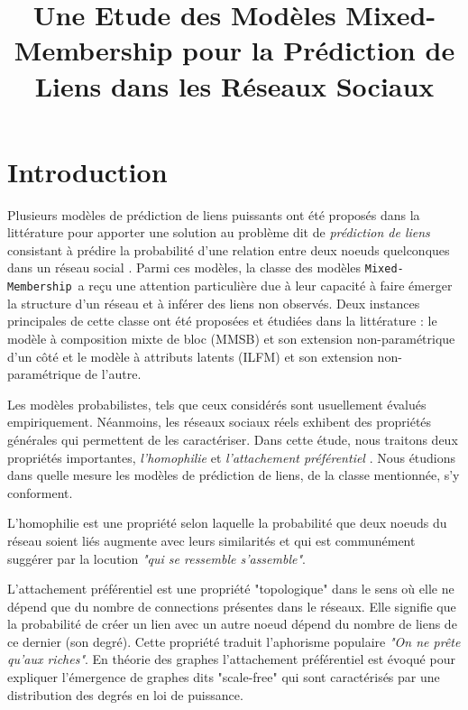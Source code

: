 \documentclass[french]{hermes-journal}
\title[]{Une Etude des Modèles Mixed-Membership pour la Prédiction de Liens dans les Réseaux Sociaux}
\newcommand{\mmm}{\texttt{Mixed-Membership}~}
\begin{document}
\maketitle

\newpage






\section{Introduction}

\label{sec:intro}

Plusieurs modèles de prédiction de liens puissants ont été proposés dans la littérature pour apporter une solution au problème dit de \textit{prédiction de liens} consistant à prédire la probabilité d'une relation entre deux noeuds quelconques dans un réseau social \cite{LibenNowell07, HassanZaki11}.
Parmi ces modèles, la classe des modèles \mmm a reçu une attention particulière due à leur capacité à faire émerger la structure d'un réseau et à inférer des liens non observés.
Deux instances principales de cette classe ont été proposées et étudiées  dans la littérature : le modèle à composition mixte de bloc (MMSB) \cite{MMSB} et son extension non-paramétrique \cite{iMMSB, fan2015dynamic} d'un côté et le modèle à attributs latents (ILFM) \cite{BMF} et son extension non-paramétrique \cite{ILFRM} de l'autre. 


Les modèles probabilistes, tels que ceux considérés sont usuellement évalués empiriquement. Néanmoins, les réseaux sociaux réels exhibent des propriétés générales qui permettent de les caractériser. Dans cette étude, nous traitons deux propriétés importantes, \textit{l'homophilie} et \textit{l'attachement préférentiel} \cite{ Barabasi2003}. Nous étudions dans quelle mesure les modèles de prédiction de liens, de la classe mentionnée, s'y conforment.

L'homophilie est une propriété selon laquelle la probabilité que deux noeuds du réseau soient liés augmente avec leurs similarités et qui est communément suggérer par la locution \emph{"qui se ressemble s'assemble"}.

L'attachement préférentiel est une propriété "topologique" dans le sens où elle ne dépend que du nombre de connections présentes dans le réseaux. Elle signifie que la probabilité de créer un lien avec un autre noeud dépend du nombre de liens de ce dernier (son degré). Cette propriété traduit l'aphorisme populaire \emph{"On ne prête qu'aux riches"}. En théorie des graphes l'attachement préférentiel est évoqué pour expliquer l'émergence de graphes dits "scale-free" qui sont caractérisés par une distribution des degrés en loi de puissance.
\end{document}
